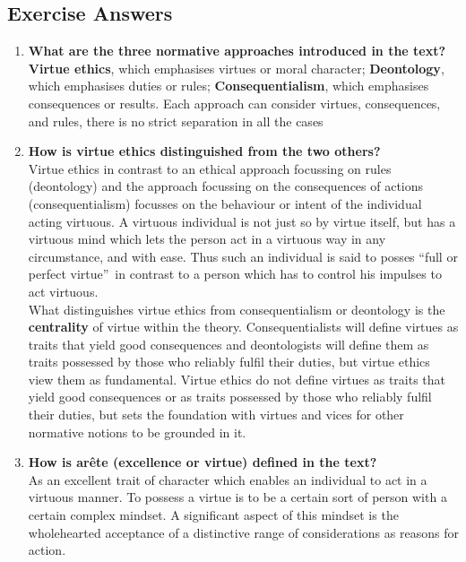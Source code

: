 \documentclass[11pt]{article}
\theoremstyle{definition}
\begin{document}
\subsection{Exercise Answers}
\begin{enumerate}
	\item \textbf{What are the three normative approaches introduced in the text?}\\
	\textbf{Virtue ethics}, which emphasises virtues or moral character; \textbf{Deontology}, which emphasises duties or rules; \textbf{Consequentialism}, which emphasises consequences or results. Each approach can consider virtues, consequences, and rules, there is no strict separation in all the cases
	\item \textbf{How is virtue ethics distinguished from the two others?}\\
	Virtue ethics in contrast to an ethical approach focussing on rules (deontology) and the approach focussing on the consequences of actions (consequentialism) focusses on the behaviour or intent of the individual acting virtuous. A virtuous individual is not just so by virtue itself, but has a virtuous mind which lets the person act in a virtuous way in any circumstance, and with ease. Thus such an individual is said to posses \textquotedblleft full or perfect virtue\textquotedblright\ in contrast to a person which has to control his impulses to act virtuous.\\
	What distinguishes virtue ethics from consequentialism or deontology is the \textbf{centrality} of virtue within the theory. Consequentialists will define virtues as traits that yield good consequences and deontologists will define them as traits possessed by those who reliably fulfil their duties, but virtue ethics view them as fundamental. Virtue ethics do not define virtues as traits that yield good consequences or as traits possessed by those who reliably fulfil their duties, but sets the foundation with virtues and vices for other normative notions to be grounded in it.
	\item \textbf{How is arête (excellence or virtue) defined in the text?}\\
	As an excellent trait of character which enables an individual to act in a virtuous manner. To possess a virtue is to be a certain sort of person with a certain complex mindset. A significant aspect of this mindset is the wholehearted acceptance of a distinctive range of considerations as reasons for action.
\end{enumerate}
\end{document}
